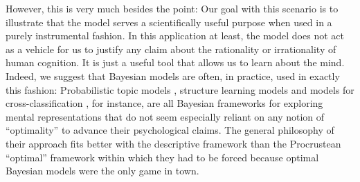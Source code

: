 However, this is very much besides the point: Our goal with this scenario is to illustrate that the model serves a scientifically useful purpose when used in a purely instrumental fashion. In this application at least, the model does not act as a vehicle for us to justify any claim about the rationality or irrationality of human cognition. It is just a useful tool that allows us to learn about the mind. Indeed, we suggest that Bayesian models are often, in practice, used in exactly this fashion: Probabilistic topic models \cite{steyvers_probabilistic_2007}, structure learning models \cite{kemp_discovery_2008} and models for cross-classification \cite{shafto_probabilistic_2011}, for instance, are all Bayesian frameworks for exploring mental representations that do not seem especially reliant on any notion of ``optimality'' to advance their psychological claims. 
The general philosophy of their approach fits better with the descriptive framework than the Procrustean ``optimal'' framework within which they had to be forced because optimal Bayesian models were the only game in town.

